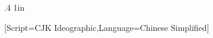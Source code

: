 \newenvironment{englishlyric}{}{}  %





\usepackage{xpatch} %


\xpatchcmd\footnoterule
  {.4\columnwidth}
  {1in}
  {}{\fail}



\newfontfamily{}[Script=CJK Ideographic,Language=Chinese Simplified]

\newcommand{\footnotespacefix}{\hspace{-0.5\ccwd}}

\usepackage{scrextend} %





\renewcommand{\thefootnote}{{\footnotefont\makexeCJKinactive\hspace{-0.5\ccwd}〔\arabic{footnote}〕\hspace{-0.5\ccwd}\makexeCJKactive}}




